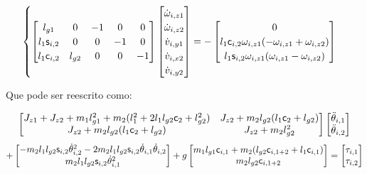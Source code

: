 \begin{itemize}
\begin{equation}
\begin{cases}
\begin{bmatrix}
l_{g1} & 0 & -1 & 0 & 0 \\
l_1 \mathsf{s}_{i,2} & 0 & 0 & -1 & 0 \\
l_1 \mathsf{c}_{i,2} & l_{g2}  & 0 & 0 & -1 \\
\end{bmatrix}
\begin{bmatrix}
\dot{\omega}_{i,z1} \\
\dot{\omega}_{i,z2} \\
\dot{v}_{i,y1} \\
\dot{v}_{i,x2} \\
\dot{v}_{i,y2} \\
\end{bmatrix}
=
-
\begin{bmatrix}
0 \\
l_1 \mathsf{c}_{i,2} \omega_{i,z1} (-\omega_{i,z1}+\omega_{i,z2}) \\
l_1 \mathsf{s}_{i,2} \omega_{i,z1} (\omega_{i,z1}-\omega_{i,z2}) \\
\end{bmatrix}

\end{cases}
\end{equation}

Que pode ser reescrito como:

$$
\begin{bmatrix}
J_{z1} + J_{z2} + m_1 l_{g1}^2 + m_2 (l_1^2 + 2 l_1 l_{g2} \mathsf{c}_2 + l_{g2}^2) & J_{z2} + m_2 l_{g2} (l_1 \mathsf{c}_2 + l_{g2}) \\
J_{z2} + m_2 l_{g2} (l_1 \mathsf{c}_2 + l_{g2}) & J_{z2} + m_2 l_{g2}^2
\end{bmatrix}
\begin{bmatrix}
\ddot{\theta}_{i,1} \\
\ddot{\theta}_{i,2} \\
\end{bmatrix}
$$
$$
+
\begin{bmatrix}
- m_2 l_1 l_{g2} \mathsf{s}_{i,2} \dot{\theta}_{i,2}^2 -2 m_2 l_1 l_{g2} \mathsf{s}_{i,2} \dot{\theta}_{i,1}  \dot{\theta} _{i,2} \\
m_2 l_1 l_{g2} \mathsf{s}_{i,2} \dot{\theta}_{i,1}^2 \\
\end{bmatrix}
+
g \begin{bmatrix}
m_1 l_{g1} \mathsf{c}_{i,1} + m_2 (l_{g2} \mathsf{c}_{i,1+2} + l_1 \mathsf{c}_{i,1}) \\
 m_2 l_{g2} \mathsf{c}_{i,1+2} \\
\end{bmatrix}
=
\begin{bmatrix}
\tau_{i,1} \\
\tau_{i,2} \\
\end{bmatrix}
$$


\end{itemize}

